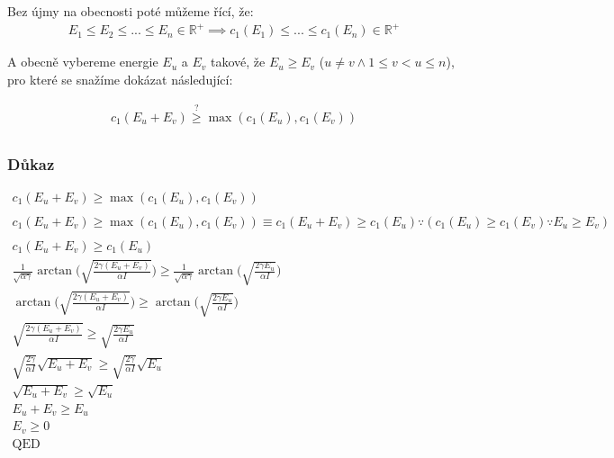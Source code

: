 Bez újmy na obecnosti poté můžeme řící, že:
\begin{equation}
    \label{eq:max_runtime_proof_p2}
    \begin{gathered}
        E_1 \leq E_2 \leq ... \leq E_n \in \mathbb{R}^+ \implies c_1(E_1) \leq ... \leq c_1(E_n) \in \mathbb{R}^+
    \end{gathered}
\end{equation}

A obecně vybereme energie $E_u$ a $E_v$ takové, že $E_u \geq E_v$ ($u \neq v \wedge 1 \leq v < u \leq n$), pro které se snažíme dokázat následující:

\begin{equation}
    \label{eq:max_runtime_proof_p3}
    \begin{gathered}
        c_1(E_u+E_v) \stackrel{?}{\geq} \max(c_1(E_u), c_1(E_v)) \\
    \end{gathered}
\end{equation}

\clearpage

\subsubsection{Důkaz}
\begin{equation}
    \label{eq:max_runtime_proof_p4}
    \begin{gathered}
        c_1(E_u+E_v) \geq \max(c_1(E_u), c_1(E_v)) \\
        \\
        c_1(E_u+E_v) \geq \max(c_1(E_u), c_1(E_v)) \equiv c_1(E_u+E_v) \geq c_1(E_u) \because (c_1(E_u)\geq c_1(E_v) \because E_u \geq E_v) \\
        \\
        c_1(E_u+E_v) \geq c_1(E_u) \\
        \frac{1}{\sqrt{\alpha\gamma}} \arctan{ \bigg( \sqrt{\frac{2 \gamma (E_u+E_v)}{\alpha I}} \bigg)} \geq \frac{1}{\sqrt{\alpha\gamma}} \arctan{ \bigg( \sqrt{\frac{2 \gamma E_u}{\alpha I}} \bigg)} \\
        \arctan{ \bigg( \sqrt{\frac{2 \gamma (E_u+E_v)}{\alpha I}} \bigg)} \geq \arctan{ \bigg( \sqrt{\frac{2 \gamma E_u}{\alpha I}} \bigg)} \\
        \sqrt{\frac{2 \gamma (E_u+E_v)}{\alpha I}} \geq \sqrt{\frac{2 \gamma E_u}{\alpha I}}\\
        \sqrt{\frac{2 \gamma }{\alpha I}} \sqrt{E_u+E_v} \geq \sqrt{\frac{2 \gamma}{\alpha I}} \sqrt{E_u}\\
        \sqrt{E_u+E_v} \geq \sqrt{E_u}\\
        E_u+E_v \geq E_u\\
        E_v \geq 0\\
        \text{QED}
    \end{gathered}
\end{equation}

